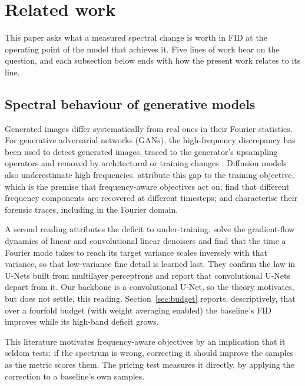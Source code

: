 \section{Related work}
\label{sec:related}

This paper asks what a measured spectral change is worth in FID at the
operating point of the model that achieves it. Five lines of work bear on the
question, and each subsection below ends with how the present work relates to
its line.

\subsection{Spectral behaviour of generative models}
\label{sec:related-spectral}

Generated images differ systematically from real ones in their Fourier
statistics. For generative adversarial networks (GANs), the high-frequency
discrepancy has been used to detect generated images, traced to the
generator's upsampling operators and removed by architectural or training
changes
\citep{durall2020watch,dzanic2020fourier,frank2020leveraging,schwarz2021frequency,chandrasegaran2021closer,jung2021spectral}.
Diffusion models also underestimate high frequencies.
\citet{ricker2024towards} attribute this gap to the training objective, which
is the premise that frequency-aware objectives act on;
\citet{yang2023diffusion} find that different frequency components are
recovered at different timesteps; and \citet{corvi2023detection} characterise
their forensic traces, including in the Fourier domain.

A second reading attributes the deficit to under-training.
\citet{wang2025spectral} solve the gradient-flow dynamics of linear and
convolutional linear denoisers and find that the time a Fourier mode takes to
reach its target variance scales inversely with that variance, so that
low-variance fine detail is learned last. They confirm the law in U-Nets built
from multilayer perceptrons and report that convolutional U-Nets depart from
it. Our backbone is a convolutional U-Net, so the theory motivates, but does
not settle, this reading. Section~\ref{sec:budget} reports, descriptively,
that over a fourfold budget (with weight averaging enabled) the baseline's FID
improves while its high-band deficit grows.

This literature motivates frequency-aware objectives by an implication that it
seldom tests: if the spectrum is wrong, correcting it should improve the
samples as the metric scores them. The pricing test measures it directly, by
applying the correction to a baseline's own samples.

